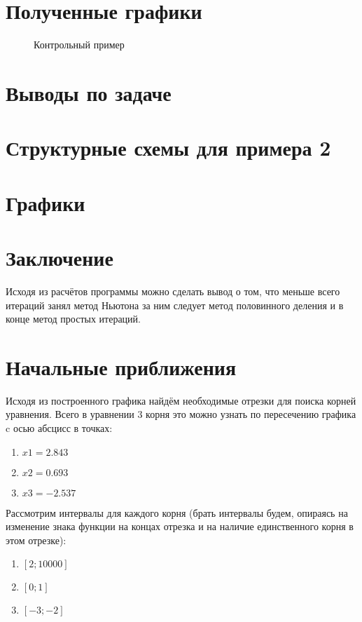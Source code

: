 \documentclass[12pt]{article}
\begin{document}
	\section{Полученные графики}
	\begin{figure}[h]
		\caption{Контрольный пример}
	\end{figure}
	\newpage 
	
	\section{Выводы по задаче}
	
	\newpage 
	
	\section{Структурные схемы для примера 2}
	
	\newpage 
	
	\section{Графики}
	
	\newpage 
	
	\section{Заключение}
	Исходя из расчётов программы можно сделать вывод о том, что меньше всего итераций занял метод Ньютона за ним следует метод половинного деления и в конце метод простых итераций. 
	\newpage
	
	\section{Начальные приближения}
	Исходя из построенного графика найдём необходимые отрезки для поиска корней уравнения. Всего в уравнении 3 корня это можно узнать по пересечению графика c осью абсцисс в точках:
	\begin{enumerate} 
		\item $x1 = 2.843$
		\item $x2 = 0.693$
		\item $x3 = -2.537$
	\end{enumerate}
	Рассмотрим интервалы для каждого корня (брать интервалы будем, опираясь на изменение знака функции на концах отрезка и на наличие единственного корня в этом отрезке):
	\begin{enumerate} 
		\item $[2 ; 10000]$
		\item $[0 ;1]$
		\item $[-3 ; -2]$
	\end{enumerate} 
	\newpage
	
	
	
\end{document}
